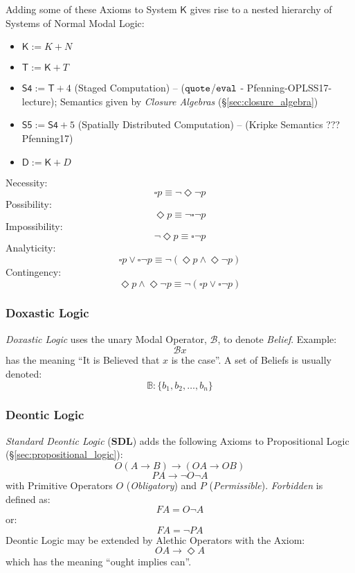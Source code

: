 Adding some of these Axioms to System $\mathsf{K}$ gives rise to a
nested hierarchy of Systems of Normal Modal Logic:
\begin{itemize}
  \item $\mathsf{K} := K + N$
  \item $\mathsf{T} := \mathsf{K} + T$
  \item $\mathsf{S4} := \mathsf{T} + 4$ (Staged Computation)
    \cite{wadler14} -- ($\mathtt{quote}$/$\mathtt{eval}$ -
    Pfenning-OPLSS17-lecture); Semantics given by \emph{Closure Algebras}
    (\S\ref{sec:closure_algebra})
  \item $\mathsf{S5} := \mathsf{S4} + 5$
    (Spatially Distributed Computation) \cite{wadler14} -- (Kripke
    Semantics ??? Pfenning17)
  \item $\mathsf{D} := \mathsf{K} + D$
\end{itemize}

Necessity:
\[
  \square p \equiv \neg \Diamond \neg p
\]
Possibility:
\[
  \Diamond p \equiv \neg \square \neg p
\]
Impossibility:
\[
  \neg \Diamond p \equiv \square \neg p
\]
Analyticity:
\[
  \square p \vee \square \neg p
  \equiv \neg (\Diamond p \wedge \Diamond \neg p)
\]
Contingency:
\[
  \Diamond p \wedge \Diamond \neg p
  \equiv \neg (\square p \vee \square \neg p)
\]



\subsubsection{Doxastic Logic}\label{sec:doxastic_logic}

\emph{Doxastic Logic} uses the unary Modal Operator, $\mathcal{B}$, to
denote \emph{Belief}. Example:
\[
  \mathcal{B} x
\]
has the meaning ``It is Believed that $x$ is the case''. A set of
Beliefs is usually denoted:
\[
  \mathbb{B}: \{ b_1, b_2, \ldots, b_n \}
\]



\subsubsection{Deontic Logic}\label{sec:deontic_logic}

\emph{Standard Deontic Logic} ($\mathbf{SDL}$) adds the following
Axioms to Propositional Logic (\S\ref{sec:propositional_logic}):
\[
  O(A \rightarrow B) \rightarrow (OA \rightarrow OB)
\]
\[
  PA \rightarrow \neg O \neg A
\]
with Primitive Operators $O$ (\emph{Obligatory}) and $P$
(\emph{Permissible}). \emph{Forbidden} is defined as:
\[
  FA = O \neg A
\]
or:
\[
  FA = \neg P A
\]
Deontic Logic may be extended by Alethic Operators with the Axiom:
\[
  OA \rightarrow \Diamond A
\]
which has the meaning ``ought implies can''.



